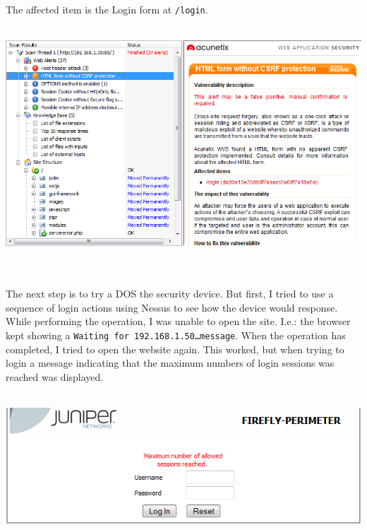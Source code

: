 \documentclass[11pt, a4paper]{article}
\begin{document}
The affected item is the Login form at \texttt{/login}.
$\;$ \\ \\
\noindent\begin{minipage}{\textwidth}
    \centering
    \includegraphics[width=\textwidth]{Acunetix_5.png}
\end{minipage}
$\;$ \\ \\
The next step is to try a DOS the security device. But first, I tried to use a sequence of login actions using Nessus to see how the device would response. While performing the operation, I was unable to open the site. I.e.: the browser kept showing a \texttt{Waiting for 192.168.1.50\ldots message}. When the operation has completed, I tried to open the website again. This worked, but when trying to login a message indicating that the maximum numbers of login sessions was reached was displayed.
$\;$ \\ \\
\noindent\begin{minipage}{\textwidth}
    \centering
    \includegraphics[width=\textwidth]{Juniper_4.png}
\end{minipage}
$\;$ \\ \\
\end{document}
